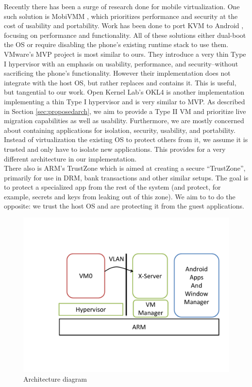 Recently there has been a surge of research done for mobile virtualization.  One such solution is MobiVMM \cite{mobivmm}, which prioritizes performance and security at the cost of usability and portability.  Work has been done to port KVM to Android \cite{columbia}, focusing on performance and functionality.  All of these solutions either dual-boot the OS or require disabling the phone's existing runtime stack to use them. \\

VMware's MVP project \cite{mvp} is most similar to ours.  They introduce a very thin Type I hypervisor with an emphasis on usability, performance, and security--without sacrificing the phone's functionality.   However their implementation does not integrate with the host OS, but rather replaces and contains it.  This is useful, but tangential to our work.  Open Kernel Lab's OKL4 \cite{okl4} is another implementation implementing a thin Type I hypervisor and is very similar to MVP.  As described in Section \ref{sec:proposedarch}, we aim to provide a Type II VM and prioritize live migration capabilities as well as usability.  Furthermore, we are mostly concerned about containing applications for isolation, security, usability, and portability.  Instead of virtualization the existing OS to protect others from it, we assume it is trusted and only have to isolate new applications.  This provides for a very different architecture in our implementation. \\

There also is ARM's TrustZone \cite{trustzone} which is aimed at creating a secure ``TrustZone'', primarily for use in DRM, bank transactions and other similar setups.  The goal is to protect a specialized app from the rest of the system (and protect, for example, secrets and keys from leaking out of this zone).  We aim to to do the opposite: we trust the host OS and are protecting it from the guest applications.

\begin{figure}[tbh]
\centering
\includegraphics[width=1.0\columnwidth]{arch}
\caption{Architecture diagram}
\label{fig:arch}
\end{figure}

